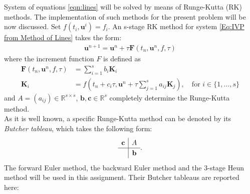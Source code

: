 \documentclass[11pt]{article}
\theoremstyle{theorem}
\theoremstyle{definition}
\begin{document}
System of equations \eqref{eqn:lines} will be solved by means of Runge-Kutta (RK) methods. The implementation of such methods for the present problem will be now discussed. Set $ f(t_i,\mathbf{u}^i) = f_i $. An s-stage RK method for system \eqref{Eq:IVP from Method of Lines} takes the form:
\begin{align*}
\mathbf{u}^{n+1} = \mathbf{u}^{n} + \tau \mathbf{F}(t_n, \mathbf{u}^n, f, \tau)
\end{align*}
where the increment function $ F $ is defined as
\begin{align*}
\mathbf{F}(t_n, \mathbf{u}^n, f, \tau) &= \sum_{i=1}^{s}b_i\mathbf{K}_i \\
\mathbf{K}_i &= f\left(t_n + c_i\tau, \mathbf{u}^n + \tau\sum_{j=1}^{s}a_{ij}\mathbf{K}_j\right), \quad \text{for } i \in \{1,\ldots,s\}
\end{align*}
and $ A = (a_{ij}) \in \mathbb{R}^{s \times s} $, $ \mathbf{b}, \mathbf{c} \in \mathbb{R}^s $ completely determine the Runge-Kutta method.\\
As it is well known, a specific Runge-Kutta method can be denoted by its \emph{Butcher tableau}, which takes the following form:
\begin{align*}
\renewcommand\arraystretch{1.2}
\begin{array}
{c|c}
\mathbf{c} &
A\\
\hline
& \mathbf{b}
\end{array}.
\end{align*}
The forward Euler method, the backward Euler method and the 3-stage Heun method will be used in this assignment. Their Butcher tableaus are reported here:
\end{document}
